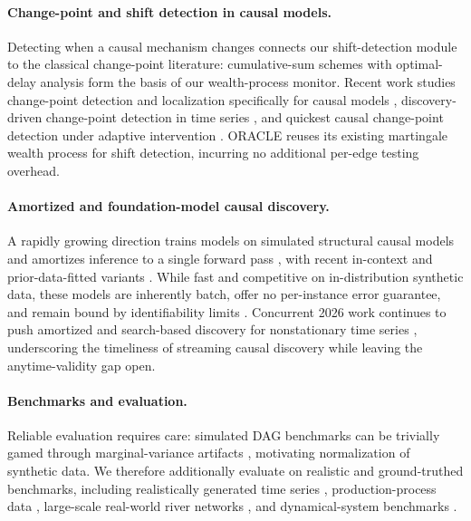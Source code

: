 \documentclass[preprint,12pt,authoryear]{elsarticle}
\begin{document}
\paragraph{Change-point and shift detection in causal models.}
Detecting when a causal mechanism changes connects our shift-detection module to the classical change-point literature: cumulative-sum schemes \cite{page1954cusum} with optimal-delay analysis \cite{lorden1971} form the basis of our wealth-process monitor. Recent work studies change-point detection and localization specifically for causal models \cite{huang2024ccp}, discovery-driven change-point detection in time series \cite{gao2025cdcpd}, and quickest causal change-point detection under adaptive intervention \cite{xu2025quickestccp}. ORACLE reuses its existing martingale wealth process for shift detection, incurring no additional per-edge testing overhead.

\paragraph{Amortized and foundation-model causal discovery.}
A rapidly growing direction trains models on simulated structural causal models and amortizes inference to a single forward pass \cite{lorch2022avici, ke2023csiva, wu2024sea}, with recent in-context and prior-data-fitted variants \cite{balazadeh2025causalpfn, robertson2025dopfn, swelam2025tabpfn}. While fast and competitive on in-distribution synthetic data, these models are inherently batch, offer no per-instance error guarantee, and remain bound by identifiability limits \cite{montagna2025demystifying}. Concurrent 2026 work continues to push amortized and search-based discovery for nonstationary time series \cite{castillo2026tsboss, faruque2026ttcd}, underscoring the timeliness of streaming causal discovery while leaving the anytime-validity gap open.

\paragraph{Benchmarks and evaluation.}
Reliable evaluation requires care: simulated DAG benchmarks can be trivially gamed through marginal-variance artifacts \cite{reisach2021beware}, motivating normalization of synthetic data. We therefore additionally evaluate on realistic and ground-truthed benchmarks, including realistically generated time series \cite{cheng2024causaltime}, production-process data \cite{gobler2024causalassembly}, large-scale real-world river networks \cite{stein2025causalrivers}, and dynamical-system benchmarks \cite{herdeanu2025causaldynamics}.
\end{document}
